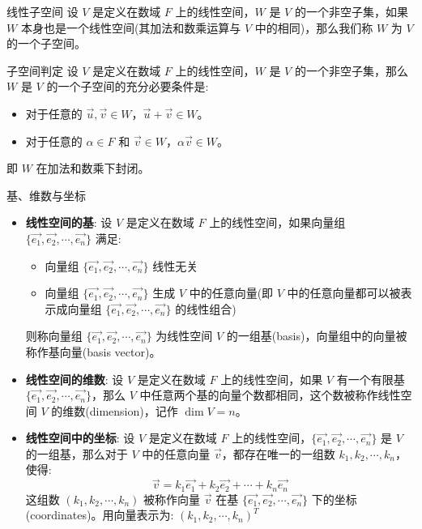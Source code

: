 \documentclass[a4paper,12pt]{ctexart}
\begin{document}
    \begin{mydef}{线性子空间}{}
    设 $V$ 是定义在数域 $F$ 上的线性空间，$W$ 是 $V$ 的一个非空子集，如果 $W$ 本身也是一个线性空间(其加法和数乘运算与 $V$ 中的相同)，那么我们称 $W$ 为 $V$ 的一个子空间。
    \end{mydef}
    
    \begin{mythm}{子空间判定}{}
        设 $V$ 是定义在数域 $F$ 上的线性空间，$W$ 是 $V$ 的一个非空子集，那么 $W$ 是 $V$ 的一个子空间的充分必要条件是:
        \begin{itemize}
            \item 对于任意的 $\vec{u}, \vec{v} \in W$，$\vec{u} + \vec{v} \in W$。
            \item 对于任意的 $\alpha \in F$ 和 $\vec{v} \in W$，$\alpha \vec{v} \in W$。
        \end{itemize}
        即 $W$ 在加法和数乘下封闭。
    \end{mythm}
    
    \begin{mydef}{基、维数与坐标}{}
    \begin{itemize}
        \item \textbf{线性空间的基}: 设 $V$ 是定义在数域 $F$ 上的线性空间，如果向量组 $\{\vec{e_1}, \vec{e_2}, \cdots, \vec{e_n}\}$ 满足:
        \begin{itemize}
            \item 向量组 $\{\vec{e_1}, \vec{e_2}, \cdots, \vec{e_n}\}$ 线性无关
            \item 向量组 $\{\vec{e_1}, \vec{e_2}, \cdots, \vec{e_n}\}$ 生成 $V$ 中的任意向量(即 $V$ 中的任意向量都可以被表示成向量组 $\{\vec{e_1}, \vec{e_2}, \cdots, \vec{e_n}\}$ 的线性组合)
        \end{itemize}
        则称向量组 $\{\vec{e_1}, \vec{e_2}, \cdots, \vec{e_n}\}$ 为线性空间 $V$ 的一组基(basis)，向量组中的向量被称作基向量(basis vector)。
        
        \item \textbf{线性空间的维数}: 设 $V$ 是定义在数域 $F$ 上的线性空间，如果 $V$ 有一个有限基 $\{\vec{e_1}, \vec{e_2}, \cdots, \vec{e_n}\}$，那么 $V$ 中任意两个基的向量个数都相同，这个数被称作线性空间 $V$ 的维数(dimension)，记作 $\dim V = n$。
        
        \item \textbf{线性空间中的坐标}: 设 $V$ 是定义在数域 $F$ 上的线性空间，$\{\vec{e_1}, \vec{e_2}, \cdots, \vec{e_n}\}$ 是 $V$ 的一组基，那么对于 $V$ 中的任意向量 $\vec{v}$，都存在唯一的一组数 $k_1, k_2, \cdots, k_n$，使得:
        \[
        \vec{v} = k_1 \vec{e_1} + k_2 \vec{e_2} + \cdots + k_n \vec{e_n}
        \]
        这组数 $(k_1, k_2, \cdots, k_n)$ 被称作向量 $\vec{v}$ 在基 $\{\vec{e_1}, \vec{e_2}, \cdots, \vec{e_n}\}$ 下的坐标(coordinates)。用向量表示为: $(k_1, k_2, \cdots, k_n)^T$
    \end{itemize}
    \end{mydef}
    
\end{document}
